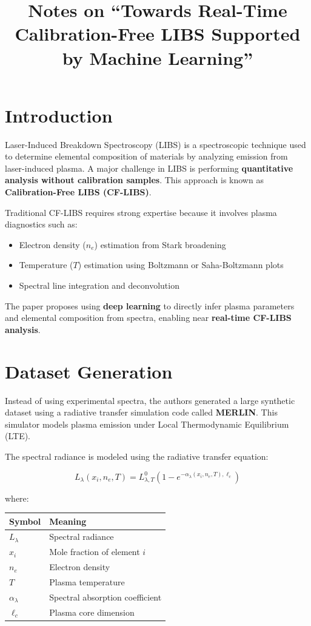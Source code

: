\documentclass[12pt]{article}
\title{Notes on ``Towards Real-Time Calibration-Free LIBS Supported by Machine Learning”}
\author{}
\date{}
\begin{document}
\maketitle

\section{Introduction}
Laser-Induced Breakdown Spectroscopy (LIBS) is a spectroscopic technique used to determine elemental composition of materials by analyzing emission from laser-induced plasma. A major challenge in LIBS is performing \textbf{quantitative analysis without calibration samples}. This approach is known as \textbf{Calibration-Free LIBS (CF-LIBS)}.

Traditional CF-LIBS requires strong expertise because it involves plasma diagnostics such as:

\begin{itemize}
\item Electron density ($n_e$) estimation from Stark broadening
\item Temperature ($T$) estimation using Boltzmann or Saha-Boltzmann plots
\item Spectral line integration and deconvolution
\end{itemize}

The paper proposes using \textbf{deep learning} to directly infer plasma parameters and elemental composition from spectra, enabling near \textbf{real-time CF-LIBS analysis}.

\section{Dataset Generation}
Instead of using experimental spectra, the authors generated a large synthetic dataset using a radiative transfer simulation code called \textbf{MERLIN}. This simulator models plasma emission under Local Thermodynamic Equilibrium (LTE).

The spectral radiance is modeled using the radiative transfer equation:

\begin{equation}
L_{\lambda}(x_i, n_e, T) = L_{\lambda,T}^{0}\left(1-e^{-\alpha_{\lambda}(x_i,n_e,T),\ell_c}\right)
\end{equation}

where:

\begin{center}
\begin{tabular}{ll}
\toprule
Symbol & Meaning \\
\midrule
$L_{\lambda}$ & Spectral radiance \\
$x_i$ & Mole fraction of element $i$ \\
$n_e$ & Electron density \\
$T$ & Plasma temperature \\
$\alpha_{\lambda}$ & Spectral absorption coefficient \\
$\ell_c$ & Plasma core dimension \\
\bottomrule
\end{tabular}
\end{center}
\end{document}
